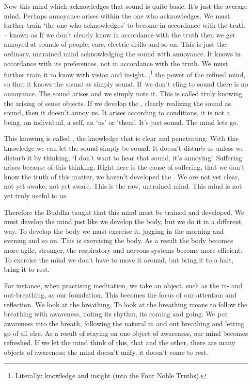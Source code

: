 Now this mind which acknowledges that sound is quite basic. It's just the average mind. Perhaps annoyance arises within the one who acknowledges. We must further train `the one who acknowledges' to become  in accordance with the truth -- known as  If we don't clearly know in accordance with the truth then we get annoyed at sounds of people, cars, electric drills and so on. This is just the ordinary, untrained mind acknowledging the sound with annoyance. It knows in accordance with its preferences, not in accordance with the truth. We must further train it to know with vision and insight, ,\footnote{Literally: knowledge and insight (into the Four Noble Truths).} the power of the refined mind, so that it knows the sound as simply sound. If~we don't cling to sound there is no annoyance. The sound arises and we simply note it. This is called truly knowing the arising of sense objects. If we develop the , clearly realizing the sound as sound, then it doesn't annoy us. It arises according to conditions, it is not a being, an individual, a self, an `us' or `them'. It's just sound. The mind lets go. 

This knowing is called , the knowledge that is clear and penetrating. With this knowledge we can let the sound simply be sound. It doesn't disturb us unless we disturb it by thinking, `I don't want to hear that sound, it's annoying.' Suffering arises because of this thinking. Right here is the cause of suffering, that we don't know the truth of this matter, we haven't developed the . We are not yet clear, not yet awake, not yet aware. This is the raw, untrained mind. This mind is not yet truly useful to us. 

Therefore the Buddha taught that this mind must be trained and developed. We must develop the mind just like we develop the body, but we do it in a different way. To develop the body we must exercise it, jogging in the morning and evening and so on. This is exercising the body. As a result the body becomes more agile, stronger, the respiratory and nervous systems become more efficient. To exercise the mind we don't have to move it around, but bring it to a halt, bring it to rest. 

For instance, when practising meditation, we take an object, such as the in- and out-breathing, as our foundation. This becomes the focus of our attention and reflection. We look at the breathing. To look at the breathing means to follow the breathing with awareness, noting its rhythm, its coming and going. We put awareness into the breath, following the natural in and out breathing and letting go of all else. As a result of staying on one object of awareness, our mind becomes refreshed. If we let the mind think of this, that and the other, there are many objects of awareness; the mind doesn't unify, it doesn't come to rest. 

